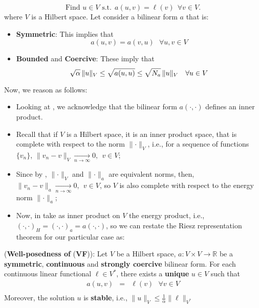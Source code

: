\begin{equation}
\mbox{Find $u \in V$ s.t.}~~a(u,v) = \ell(v)~~ \forall v \in V. \nonumber
\end{equation}
where $V$ is a Hilbert space.
Let consider a bilinear form $a$ that is:
\begin{itemize}
\item[] \textbf{Symmetric}: This implies that
\begin{equation*}
a(u,v) = a(v,u)~~~\forall u,v\in V
\end{equation*}
\item[] \textbf{Bounded} and \textbf{Coercive}: These imply that
\begin{equation}
 \sqrt{\alpha} \,\lVert u \rVert_V \le \sqrt{a(u,u)} \le \sqrt{N_a} \,\lVert u \rVert_V~~~\forall u \in V \labeq{VnormeqEnorm}
\end{equation}
\end{itemize}
Now, we reason as follows:
\begin{itemize}
\item Looking at , we acknowledge that the bilinear form $a(\cdot,\cdot)$
defines an inner product.

\item Recall that if $V$ is a Hilbert space, it is an inner product space,
that is complete with respect to the norm $\lVert \cdot \rVert_V$, i.e.,
for a sequence of functions $\{v_n\}$,
$\lVert v_n - v\rVert_V \xrightarrow[n\rightarrow \infty]{} 0,~~v\in V$;
\item Since by ,
$\lVert \cdot \rVert_V$ and $\lVert \cdot \rVert_a$ are equivalent
norms, then,
$\lVert v_n - v\rVert_a \xrightarrow[n\rightarrow \infty]{} 0,~~v \in V$,
so $V$ is also complete with respect to the energy norm $\lVert \cdot \rVert_a$;
\item Now, in  take as inner product on $V$ the energy product,
i.e., $(\cdot,\cdot)_H = (\cdot,\cdot)_a = a(\cdot,\cdot)$,
so we can restate the Riesz representation theorem for our particular case
as:
\end{itemize}

\begin{theorem} 
 (\textbf{Well-posedness of} (\textbf{VF})):
Let $V$ be a Hilbert space,
$a: V \times V \rightarrow \mathbb{R}$ be a \textbf{symmetric}, \textbf{continuous}
and \textbf{strongly coercive} bilinear form.
For each continuous linear functional $\ell \in V^{*}$, there exists a \textbf{unique}
$u \in V$ such that
\begin{equation}
\left.
\begin{array}{rll}
a(u,v) & = & \ell(v)  ~~~\forall v \in V \\
\end{array}
\right. \nonumber
\end{equation}
Moreover, the solution $u$ is \textbf{stable}, i.e.,  $\lVert u \rVert_V \le \frac{1}{\alpha} \lVert \ell \rVert_{V^{*}}$
\end{theorem}


